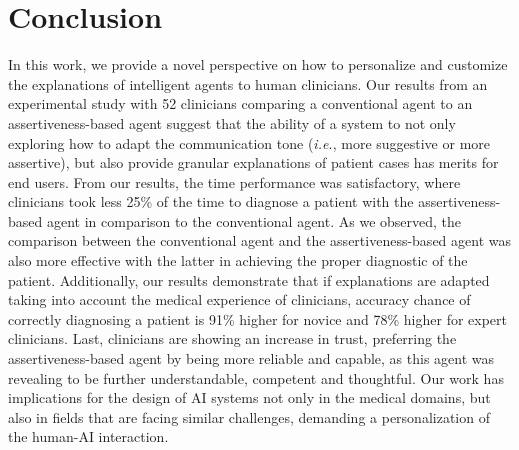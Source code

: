 \section{Conclusion}
\label{sec:chap006008}

In this work, we provide a novel perspective on how to personalize and customize the explanations of intelligent agents to human clinicians.
Our results from an experimental study with 52 clinicians comparing a conventional agent to an assertiveness-based agent suggest that the ability of a system to not only exploring how to adapt the communication tone ({\it i.e.}, more suggestive or more assertive), but also provide granular explanations of patient cases has merits for end users.
From our results, the time performance was satisfactory, where clinicians took less 25\% of the time to diagnose a patient with the assertiveness-based agent in comparison to the conventional agent.
As we observed, the comparison between the conventional agent and the assertiveness-based agent was also more effective with the latter in achieving the proper diagnostic of the patient.
Additionally, our results demonstrate that if explanations are adapted taking into account the medical experience of clinicians, accuracy chance of correctly diagnosing a patient is 91\% higher for novice and 78\% higher for expert clinicians.
Last, clinicians are showing an increase in trust, preferring the assertiveness-based agent by being more reliable and capable, as this agent was revealing to be further understandable, competent and thoughtful.
Our work has implications for the design of \ac{AI} systems not only in the medical domains, but also in fields that are facing similar challenges, demanding a personalization of the human-AI interaction.